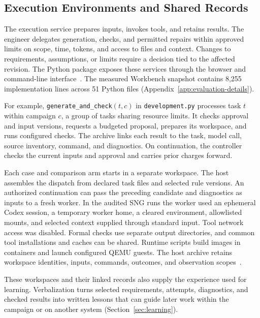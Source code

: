 \subsection{Execution Environments and Shared Records}
\label{sec:execution-environments}
The execution service prepares inputs, invokes tools, and retains results. The engineer delegates generation, checks, and permitted repairs within approved limits on scope, time, tokens, and access to files and context. Changes to requirements, assumptions, or limits require a decision tied to the affected revision. The Python package exposes these services through the browser and command-line interface~\cite{scpCheckpoint}. The measured Workbench snapshot contains 8,255 implementation lines across 51 Python files (Appendix~\ref{app:evaluation-details}).

For example, \texttt{generate\_and\_check}$(t,c)$ in \texttt{development.py} processes task $t$ within campaign $c$, a group of tasks sharing resource limits. It checks approval and input versions, requests a budgeted proposal, prepares its workspace, and runs configured checks. The archive links each result to the task, model call, source inventory, command, and diagnostics. On continuation, the controller checks the current inputs and approval and carries prior charges forward.

Each case and comparison arm starts in a separate workspace. The host assembles the dispatch from declared task files and selected rule versions. An authorized continuation can pass the preceding candidate and diagnostics as inputs to a fresh worker. In the audited SNG runs the worker used an ephemeral Codex session, a temporary worker home, a cleared environment, allowlisted mounts, and selected context supplied through standard input. Tool network access was disabled. Formal checks use separate output directories, and common tool installations and caches can be shared. Runtime scripts build images in containers and launch configured QEMU guests. The host archive retains workspace identities, inputs, commands, outcomes, and observation scopes~\cite{scpCheckpoint,checkpointResults}.

These workspaces and their linked records also supply the experience used for learning. Verbalization turns selected requirements, attempts, diagnostics, and checked results into written lessons that can guide later work within the campaign or on another system (Section~\ref{sec:learning}).

